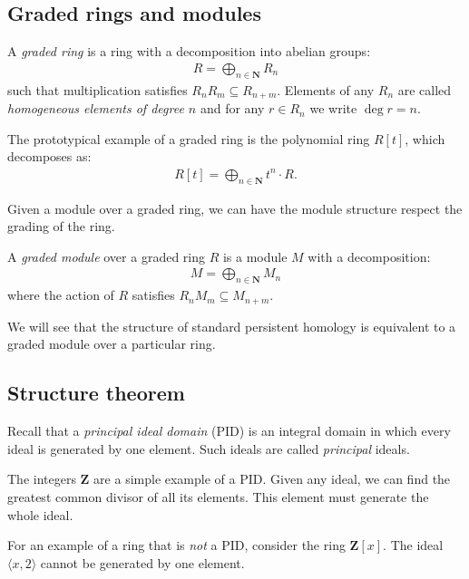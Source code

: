 \subsection{Graded rings and modules}

\begin{definition}
A \emph{graded ring} is a ring with a decomposition into abelian groups:
\begin{align*}
  R = \bigoplus_{n \in \mathbf{N}} R_n
\end{align*}
such that multiplication satisfies $R_n R_m \subseteq R_{n+m}$. Elements of any $R_n$ are called \emph{homogeneous elements of degree $n$} and for any $r \in R_n$ we write $\deg r = n$.
\end{definition}

\begin{example}
The prototypical example of a graded ring is the polynomial ring $R[t]$, which decomposes as:
\begin{align*}
  R[t] = \bigoplus_{n \in \mathbf{N}} t^n \cdot R.
\end{align*}
\end{example}

Given a module over a graded ring, we can have the module structure respect the grading of the ring.

\begin{definition}
A \emph{graded module} over a graded ring $R$ is a module $M$ with a decomposition:
\begin{align*}
  M = \bigoplus_{n \in \mathbf{N}} M_n
\end{align*}
where the action of $R$ satisfies $R_n M_m \subseteq M_{n+m}$.
\end{definition}

We will see that the structure of standard persistent homology is equivalent to a graded module over a particular ring.

\subsection{Structure theorem}

Recall that a \emph{principal ideal domain} (PID) is an integral domain in which every ideal is generated by one element. Such ideals are called \emph{principal} ideals.

\begin{example}
The integers $\mathbf{Z}$ are a simple example of a PID. Given any ideal, we can find the greatest common divisor of all its elements. This element must generate the whole ideal.

For an example of a ring that is \emph{not} a PID, consider the ring $\mathbf{Z}[x]$. The ideal $\langle x, 2 \rangle$ cannot be generated by one element.
\end{example}

